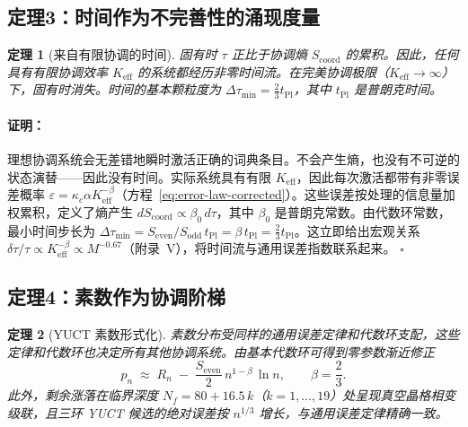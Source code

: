 \documentclass[12pt,a4paper]{article}
\newtheorem{theorem}{定理}[section]
\theoremstyle{remark}
\renewenvironment{proof}{\paragraph{证明：}}{\hfill$\square$}
\newcommand{\tPl}{t_{\mathrm{Pl}}}
\newcommand{\Scoord}{S_{\mathrm{coord}}}
\begin{document}
	\subsection{定理3：时间作为不完善性的涌现度量}
	
	\begin{theorem}[来自有限协调的时间]
		\label{thm:time}
		固有时 \(\tau\) 正比于协调熵 \(\Scoord\) 的累积。因此，任何具有有限协调效率 \(K_{\mathrm{eff}}\) 的系统都经历非零时间流。在完美协调极限（\(K_{\mathrm{eff}} \to \infty\)）下，固有时消失。时间的基本颗粒度为 \(\Delta \tau_{\min} = \frac{2}{3} \tPl\)，其中 \(\tPl\) 是普朗克时间。
	\end{theorem}
	
	\begin{proof}
		理想协调系统会无差错地瞬时激活正确的词典条目。不会产生熵，也没有不可逆的状态演替——因此没有时间。实际系统具有有限 \(K_{\mathrm{eff}}\)，因此每次激活都带有非零误差概率 \(\varepsilon = \kappa_c \alpha K_{\mathrm{eff}}^{-\beta}\)（方程~\ref{eq:error-law-corrected}）。这些误差按处理的信息量加权累积，定义了熵产生 \(d\Scoord \propto \beta_0 \, d\tau\)，其中 \(\beta_0\) 是普朗克常数。由代数环常数，最小时间步长为 \(\Delta \tau_{\min} = S_{\mathrm{even}}/S_{\mathrm{odd}} \, \tPl = \beta \, \tPl = \frac{2}{3} \tPl\)。这立即给出宏观关系 \(\delta\tau/\tau \propto K_{\mathrm{eff}}^{-\beta} \propto M^{-0.67}\)（附录~V），将时间流与通用误差指数联系起来。
	\end{proof}
	
	\subsection{定理4：素数作为协调阶梯}
	
	\begin{theorem}[YUCT 素数形式化]\label{thm:prime}
		素数分布受同样的通用误差定律和代数环支配，这些定律和代数环也决定所有其他协调系统。由基本代数环可得到零参数渐近修正
		\begin{equation}\label{eq:yuct-prime-theorem}
			\boxed{ p_n \;\approx\; R_n \;-\; \frac{S_{\mathrm{even}}}{2}\,
				n^{1-\beta}\,\ln n },
			\qquad \beta = \frac{2}{3}.
		\end{equation}
		此外，剩余涨落在临界深度 \(N_f = 80 + 16.5\,k\)（\(k=1,\dots,19\)）处呈现真空晶格相变级联，且三环 YUCT 候选的绝对误差按 \(n^{1/3}\) 增长，与通用误差定律精确一致。
	\end{theorem}
	
\end{document}

